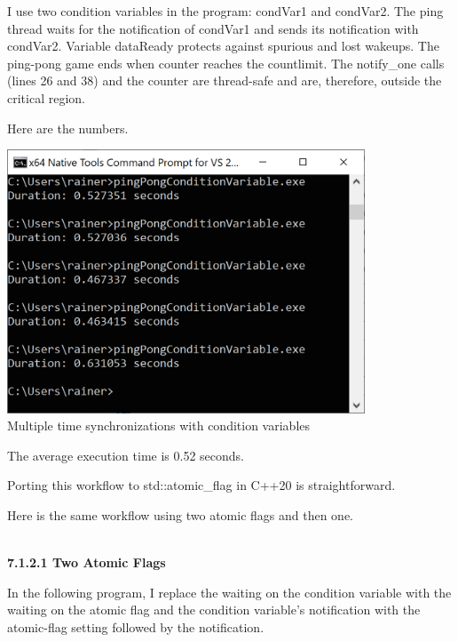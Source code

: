 I use two condition variables in the program: condVar1 and condVar2. The ping thread waits for the notification of condVar1 and sends its notification with condVar2. Variable dataReady protects against spurious and lost wakeups. The ping-pong game ends when counter reaches the countlimit. The notify\_one calls (lines 26 and 38) and the counter are thread-safe and are, therefore, outside the critical region.

Here are the numbers.

\begin{center}
\includegraphics[width=0.8\textwidth]{content/3/chapter7/images/2.png}\\
Multiple time synchronizations with condition variables
\end{center}

The average execution time is 0.52 seconds.

Porting this workflow to std::atomic\_flag in C++20 is straightforward.


Here is the same workflow using two atomic flags and then one.

\hspace*{\fill} \\ %
\noindent
\textbf{7.1.2.1\hspace{0.2cm} Two Atomic Flags}

In the following program, I replace the waiting on the condition variable with the waiting on the atomic flag and the condition variable’s notification with the atomic-flag setting followed by the notification.

